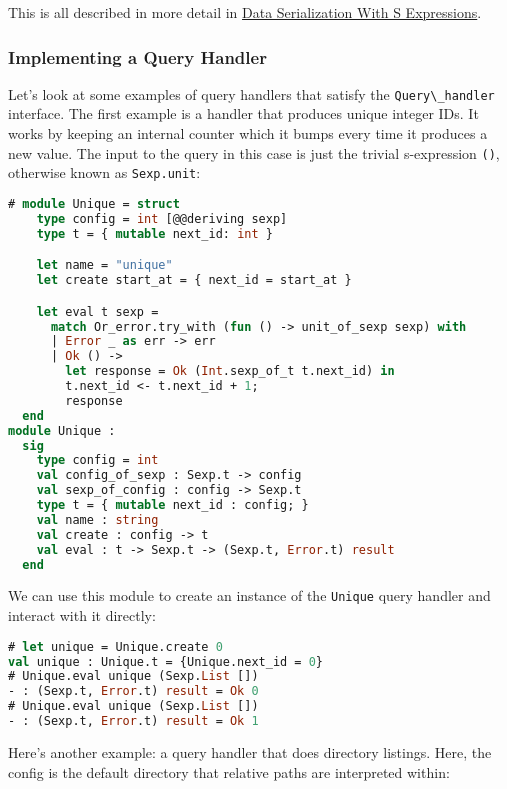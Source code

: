 This is all described in more detail in
\href{data-serialization.html\#data-serialization-with-s-expressions}{Data
Serialization With S Expressions}.

\hypertarget{implementing-a-query-handler}{%
\subsubsection{Implementing a Query
Handler}\label{implementing-a-query-handler}}

Let's look at some examples of query handlers that satisfy the
\passthrough{\lstinline!Query\_handler!} interface. The first example is
a handler that produces unique integer IDs. It works by keeping an
internal counter which it bumps every time it produces a new value. The
input to the query in this case is just the trivial s-expression
\passthrough{\lstinline!()!}, otherwise known as
\passthrough{\lstinline!Sexp.unit!}:

\begin{lstlisting}[language=Caml]
# module Unique = struct
    type config = int [@@deriving sexp]
    type t = { mutable next_id: int }

    let name = "unique"
    let create start_at = { next_id = start_at }

    let eval t sexp =
      match Or_error.try_with (fun () -> unit_of_sexp sexp) with
      | Error _ as err -> err
      | Ok () ->
        let response = Ok (Int.sexp_of_t t.next_id) in
        t.next_id <- t.next_id + 1;
        response
  end
module Unique :
  sig
    type config = int
    val config_of_sexp : Sexp.t -> config
    val sexp_of_config : config -> Sexp.t
    type t = { mutable next_id : config; }
    val name : string
    val create : config -> t
    val eval : t -> Sexp.t -> (Sexp.t, Error.t) result
  end
\end{lstlisting}

We can use this module to create an instance of the
\passthrough{\lstinline!Unique!} query handler and interact with it
directly:

\begin{lstlisting}[language=Caml]
# let unique = Unique.create 0
val unique : Unique.t = {Unique.next_id = 0}
# Unique.eval unique (Sexp.List [])
- : (Sexp.t, Error.t) result = Ok 0
# Unique.eval unique (Sexp.List [])
- : (Sexp.t, Error.t) result = Ok 1
\end{lstlisting}

Here's another example: a query handler that does directory listings.
Here, the config is the default directory that relative paths are
interpreted within:

